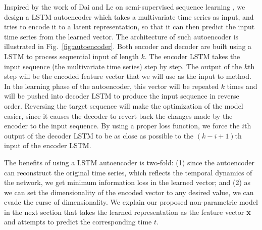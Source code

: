 Inspired by the work of Dai and Le on semi-supervised sequence learning \cite{dai2015semi}, we design a LSTM autoencoder which takes a multivariate time series as input, and tries to encode it to a latent representation, so that it can then predict the input time series from the learned vector. The architecture of such autoencoder is illustrated in Fig.~\ref{fig:autoencoder}. Both encoder and decoder are built using a LSTM to process sequential input of length $k$. The encoder LSTM takes the input sequence (the multivariate time series) step by step. The output of the $k$th step will be the encoded feature vector that we will use as the input to \npglm method. In the learning phase of the autoencoder, this vector will be repeated $k$ times and will be pushed into decoder LSTM to produce the input sequence in reverse order. Reversing the target sequence will make the optimization of the model easier, since it causes the decoder to revert back the changes made by the encoder to the input sequence. By using a proper loss function, we force the $i$th output of the decoder LSTM to be as close as possible to the $(k-i+1)$th input of the encoder LSTM.

The benefits of using a LSTM autoencoder is two-fold: (1) since the autoencoder can reconstruct the original time series, which reflects the temporal dynamics of the network, we get minimum information loss in the learned vector; and (2) as we can set the dimensionality of the encoded vector to any desired value, we can evade the curse of dimensionality. We explain our proposed non-parametric model in the next section that takes the learned representation as the feature vector $\mathbf{x}$ and attempts to predict the corresponding time $t$. 


